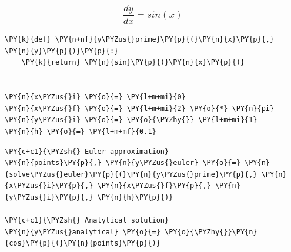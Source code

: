     \begin{center}
    \end{center}
    { \hspace*{\fill} \\}
    
    \hypertarget{fracdydx-sinx}{%
\subsubsection{\texorpdfstring{\[\frac{dy}{dx} = sin(x)\]}{\textbackslash frac\{dy\}\{dx\} = sin(x)}}\label{fracdydx-sinx}}

    \begin{tcolorbox}[breakable, size=fbox, boxrule=1pt, pad at break*=1mm,colback=cellbackground, colframe=cellborder]
\begin{Verbatim}[commandchars=\\\{\}]
\PY{k}{def} \PY{n+nf}{y\PYZus{}prime}\PY{p}{(}\PY{n}{x}\PY{p}{,} \PY{n}{y}\PY{p}{)}\PY{p}{:}
    \PY{k}{return} \PY{n}{sin}\PY{p}{(}\PY{n}{x}\PY{p}{)}


\PY{n}{x\PYZus{}i} \PY{o}{=} \PY{l+m+mi}{0}
\PY{n}{x\PYZus{}f} \PY{o}{=} \PY{l+m+mi}{2} \PY{o}{*} \PY{n}{pi}
\PY{n}{y\PYZus{}i} \PY{o}{=} \PY{o}{\PYZhy{}} \PY{l+m+mi}{1}
\PY{n}{h} \PY{o}{=} \PY{l+m+mf}{0.1}
\end{Verbatim}
\end{tcolorbox}

    \begin{tcolorbox}[breakable, size=fbox, boxrule=1pt, pad at break*=1mm,colback=cellbackground, colframe=cellborder]
\begin{Verbatim}[commandchars=\\\{\}]
\PY{c+c1}{\PYZsh{} Euler approximation}
\PY{n}{points}\PY{p}{,} \PY{n}{y\PYZus{}euler} \PY{o}{=} \PY{n}{solve\PYZus{}euler}\PY{p}{(}\PY{n}{y\PYZus{}prime}\PY{p}{,} \PY{n}{x\PYZus{}i}\PY{p}{,} \PY{n}{x\PYZus{}f}\PY{p}{,} \PY{n}{y\PYZus{}i}\PY{p}{,} \PY{n}{h}\PY{p}{)}

\PY{c+c1}{\PYZsh{} Analytical solution}
\PY{n}{y\PYZus{}analytical} \PY{o}{=} \PY{o}{\PYZhy{}}\PY{n}{cos}\PY{p}{(}\PY{n}{points}\PY{p}{)}
\end{Verbatim}
\end{tcolorbox}

